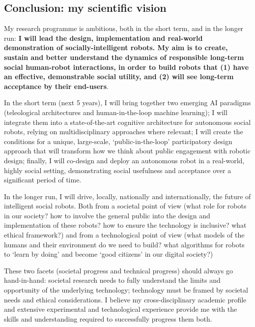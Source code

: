 \subsection{Conclusion: my scientific vision}

My research programme is ambitious, both in the short term, and in the longer
run: \textbf{I will lead the design, implementation and real-world demonstration
of socially-intelligent robots. My aim is to create, sustain and better
understand the dynamics of responsible long-term social human-robot
interactions, in order to build robots that (1) have an effective, demonstrable
social utility, and (2) will see long-term acceptance by their end-users}.


In the short term (next 5 years), I will bring together two emerging AI
paradigms (teleological architectures and human-in-the-loop machine learning); I
will integrate them into a state-of-the-art cognitive architecture for
autonomous social robots, relying on multidisciplinary approaches where
relevant; I will create the conditions for a unique, large-scale,
`public-in-the-loop' participatory design approach that will transform how we
think about public engagement with robotic design; finally, I will co-design
and deploy an autonomous robot in a real-world, highly social setting,
demonstrating social usefulness and acceptance over a significant period of
time.

In the longer run, I will drive, locally, nationally and internationally, the
future of intelligent social robots. Both from a societal point of view (what
role for robots in our society? how to involve the general public into the
design and implementation of these robots?  how to ensure the technology is
inclusive? what ethical framework?) and from a technological point of view (what
models of the humans and their environment do we need to build? what algorithms
for robots to `learn by doing' and become `good citizens' in our digital
society?)

These two facets (societal progress and technical progress) should always go
hand-in-hand: societal research needs to fully understand the limits and
opportunity of the underlying technology; technology must be framed
by societal needs and ethical considerations. I believe my cross-disciplinary
academic profile and extensive experimental and technological experience provide me
with the skills and understanding required to successfully progress them both.

